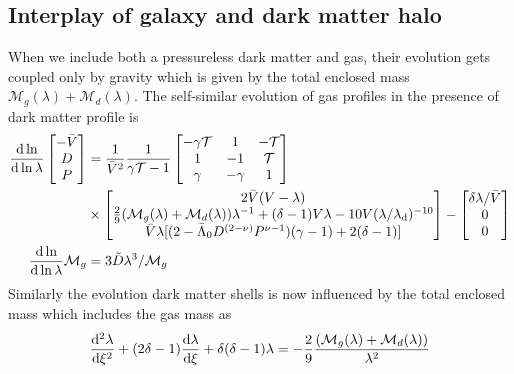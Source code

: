 \subsection{Interplay of galaxy and dark matter halo}
\label{sec:methods-interplay}
When we include both a pressureless dark matter and gas, their evolution gets coupled only by gravity which is given by the total enclosed mass $\mathcal{M}_g(\lambda)+\mathcal{M}_d(\lambda)$. The self-similar evolution of gas profiles in the presence of dark matter profile is
\begin{align}
\label{eq:selfsim-sph_hydro-mat-gasdm}
\begin{split}
\frac{{\rm d} \ln}{{\rm d} \ln \lambda}
\begin{bmatrix}
 -\bar{V}\\
 D\\
 P
\end{bmatrix} &= \frac{1}{\bar{V}^2} \frac{1}{\gamma \mathcal{T}-1}
\begin{bmatrix}
-\gamma \mathcal{T} & 1 & -\mathcal{T}\\
1 & -1 & \mathcal{T}\\
\gamma & -\gamma & 1
\end{bmatrix}\\
& \times \begin{bmatrix}
 2 \bar{V} (V-\lambda) \\
\frac{2}{9} (\mathcal{M}_g(\lambda)+\mathcal{M}_d(\lambda)) \lambda^{-1} + (\delta -1 ) V \lambda - 10V(\lambda/\lambda_{\rm d})^{-10} \\
 \bar{V} \lambda [(2-\Bar{\Lambda}_0 D^{(2-\nu)} P^{\nu-1})(\gamma - 1) + 2(\delta -1)]
\end{bmatrix} -
\begin{bmatrix}
\delta \lambda/ \bar{V}\\
0\\
0\\
\end{bmatrix}\\
\frac{{\rm d} \ln}{{\rm d} \ln \lambda} \mathcal{M}_g &= 3 \tilde{D} \lambda^{3} /  \mathcal{M}_g \qquad \qquad
\end{split}
\end{align}
Similarly the evolution dark matter shells is now influenced by the total enclosed mass which includes the gas mass as 
\begin{align}
\label{eq:gas-dm-dm-traj}
\frac{{\rm d}^2 \lambda}{{\rm d} \xi^2} + (2 \delta - 1) \frac{{\rm d} \lambda}{{\rm d}  \xi} + \delta ( \delta -1) \lambda = - \frac{2}{9} \frac{(\mathcal{M}_g(\lambda)+\mathcal{M}_d(\lambda))}{\lambda^2 }
\end{align}
